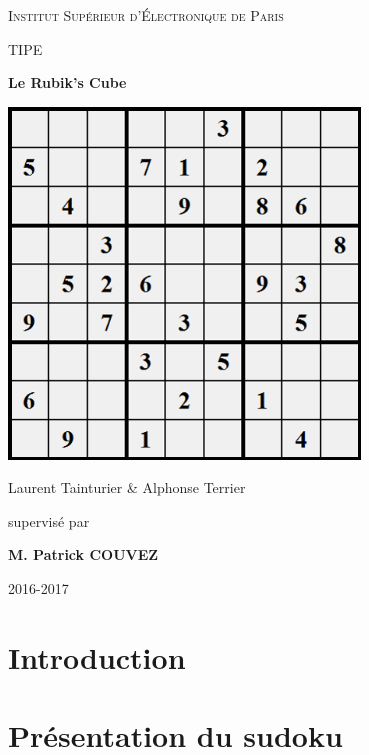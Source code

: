 \documentclass[12pt,a4paper]{report}
\newenvironment{changemargin}[2]{\begin{list}{}{%
\setlength{\topsep}{0pt}%
\setlength{\leftmargin}{0pt}%
\setlength{\rightmargin}{0pt}%
\setlength{\listparindent}{\parindent}%
\setlength{\itemindent}{\parindent}%
\setlength{\parsep}{0pt plus 1pt}%
\addtolength{\leftmargin}{#1}%
\addtolength{\rightmargin}{#2}%
}\item }{\end{list}}
\begin{document}
\FloatBarrier

\begin{titlepage}
\begin{changemargin}{-1cm}{0cm}
	\centering
	\vspace{5cm}
	{\scshape\huge Institut Supérieur d'Électronique de Paris \par}
	\vspace{1cm}
	{\scshape\LARGE TIPE\par}
	\vspace{1.5cm}
	{\fontsize{45}{45}\selectfont\bfseries Le Rubik's Cube\par}
	\vspace{2cm}
	\includegraphics[width=0.7\textwidth]{pagedegarde.png}\par\vspace{1.5cm}
	{\LARGE Laurent Tainturier \& Alphonse Terrier\par}
	\vfill
	\large supervisé par\par
	\large \bfseries M. Patrick COUVEZ

	\vfill


	{\large 2016-2017}
\end{changemargin}
\end{titlepage}

\tableofcontents
{}
\chapter*{Introduction}
	

	\chapter{Présentation du sudoku}
	
\end{document}
